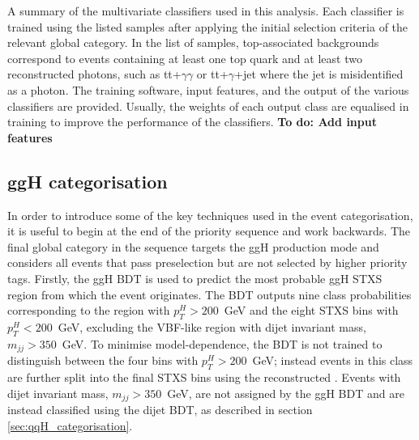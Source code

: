 \begin{landscape}
\thispagestyle{empty}
\begin{table}[htb]
    \caption[Categorisation multivariate classifiers]{A summary of the multivariate classifiers used in this analysis. Each classifier is trained using the listed samples after applying the initial selection criteria of the relevant global category. In the list of samples, top-associated backgrounds correspond to events containing at least one top quark and at least two reconstructed photons, such as tt+$\gamma\gamma$ or tt+$\gamma$+jet where the jet is misidentified as a photon.  The training software, input features, and the output of the various classifiers are provided. Usually, the weights of each output class are equalised in training to improve the performance of the classifiers. \textbf{To do: Add input features}}
    \label{tab:categorisation_discriminants}
    \centering
    \scriptsize
    \renewcommand{\arraystretch}{1.5}
    \setlength{\tabcolsep}{3pt}
    
\end{table}
\end{landscape}

\newpage
\subsection{ggH categorisation}
In order to introduce some of the key techniques used in the event categorisation, it is useful to begin at the end of the priority sequence and work backwards. The final global category in the sequence targets the ggH production mode and considers all events that pass preselection but are not selected by higher priority tags. Firstly, the ggH BDT is used to predict the most probable ggH STXS region from which the event originates. The BDT outputs nine class probabilities corresponding to the region with $p_T^H>200$~GeV and the eight STXS bins with $p_T^H<200$~GeV, excluding the VBF-like region with dijet invariant mass, $m_{jj}>350$~GeV. To minimise model-dependence, the BDT is not trained to distinguish between the four bins with $p_T^H>200$~GeV; instead events in this class are further split into the final STXS bins using the reconstructed \ptgg. Events with dijet invariant mass, $m_{jj}>350$~GeV, are not assigned by the ggH BDT and are instead classified using the dijet BDT, as described in section \ref{sec:qqH_categorisation}.

